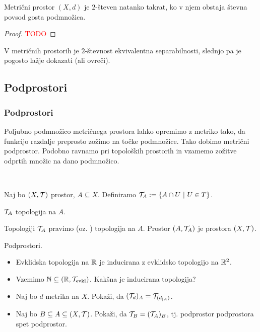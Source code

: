 \begin{izrek}
    Metrični prostor $(X, d)$ je $2$-števen natanko takrat, ko v njem obstaja števna povsod gosta podmnožica.
\end{izrek}

\begin{proof}
    \textcolor{red}{TODO}
\end{proof}

\begin{opomba}
    V metričnih prostorih je $2$-števnost ekvivalentna separabilnosti, slednjo pa je pogosto lažje dokazati (ali ovreči).
\end{opomba}

\newpage
\subsection{Podprostori}
\subsubsection{Podprostori}
Poljubno podmnožico metričnega prostora lahko opremimo z metriko tako, da funkcijo razdalje preprosto zožimo na točke podmnožice. Tako dobimo metrični podprostor. Podobno ravnamo pri topoloških prostorih in vzamemo zožitve odprtih množic na dano podmnožico.

\,

Naj bo $(X, \mathcal{T})$ prostor, $A \subseteq X$. Definiramo $\mathcal{T}_A := \left\{A \cap U \ | \ U \in T\right\}$.

\begin{trditev}
    $\mathcal{T}_A$ topologija na $A$.
\end{trditev}

\begin{definicija}
    Topologiji $\mathcal{T}_A$ pravimo  (oz. ) topologija na $A$.
    Prostor $(A, \mathcal{T}_A)$ je  prostora $(X, \mathcal{T})$.
\end{definicija}

\begin{primer}
    Podprostori.
    \begin{itemize}
        \item Evklidska topologija na $\mathbb{R}$ je inducirana z evklidsko topologijo na $\mathbb{R}^2$.
        \item Vzemimo $\mathbb{N} \subseteq (\mathbb{R}, \mathcal{T}_\text{evkl})$. Kakšna je inducirana topologija?
        \item Naj bo $d$ metrika na $X$. Pokaži, da $(\mathcal{T}_d)_A = \mathcal{T}_{(d_{|A})}$.        
        \item Naj bo $B \subseteq A \subseteq (X, \mathcal{T})$. Pokaži, da $\mathcal{T}_B = (\mathcal{T}_A)_B$, tj. podprostor podprostora spet podprostor.
    \end{itemize}
\end{primer}

